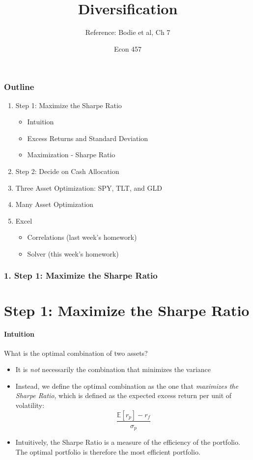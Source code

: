 \documentclass{beamer}
\title{Diversification}
\subtitle{Reference: Bodie et al, Ch 7}
\author{Econ 457}
\date{\week}
\begin{document}
\frame{\titlepage}

\begin{frame}
    \frametitle{Outline}

    \begin{enumerate}
        \item Step 1: Maximize the Sharpe Ratio
        \begin{itemize}
            \item Intuition
            \item Excess Returns and Standard Deviation
            \item Maximization - Sharpe Ratio
        \end{itemize}
        \item Step 2: Decide on Cash Allocation
        \item Three Asset Optimization: SPY, TLT, and GLD
        \item Many Asset Optimization
        \item Excel
        \begin{itemize}
            \item Correlations (last week's homework)
            \item Solver (this week's homework)
        \end{itemize}
    \end{enumerate}
\end{frame}


\begin{frame}[t]
    \frametitle{1. Step 1: Maximize the Sharpe Ratio}
    \section{Step 1: Maximize the Sharpe Ratio}
    \framesubtitle{Intuition}

    What is the optimal combination of two assets?
    \begin{itemize}
        \item It is \textit{not} necessarily the combination that minimizes the variance
        \item Instead, we define the optimal combination as the one that \textit{maximizes the Sharpe Ratio}, which is defined as the expected excess return per unit of volatility:
        $$\frac{\mathbb{E}[r_p] - r_f}{\sigma_p}$$
        \item Intuitively, the Sharpe Ratio is a measure of the efficiency of the portfolio.   The optimal portfolio is therefore the most efficient portfolio.
    \end{itemize}    

\end{frame}
\end{document}
